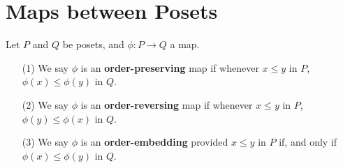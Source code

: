 \section{Maps between Posets}
\label{section_1.7}

\begin{definition}
  Let $P$ and  $Q$ be posets, and  $\phi:P \xrightarrow{} Q$ a map.
  \begin{enumerate}
    \item[(1)] We say $\phi$ is an \textbf{order-preserving} map if
      whenever $x \leq y$ in $P$,  $\phi(x) \leq \phi(y)$ in $Q$.

    \item[(2)] We say $\phi$ is an \textbf{order-reversing} map if
      whenever $x \leq y$ in $P$,  $\phi(y) \leq \phi(x)$ in $Q$.

    \item[(3)] We say $\phi$ is an \textbf{order-embedding} provided
      $x \leq y$ in $P$ if, and only if $\phi(x) \leq \phi(y)$ in $Q$.
  \end{enumerate}
\end{definition}

